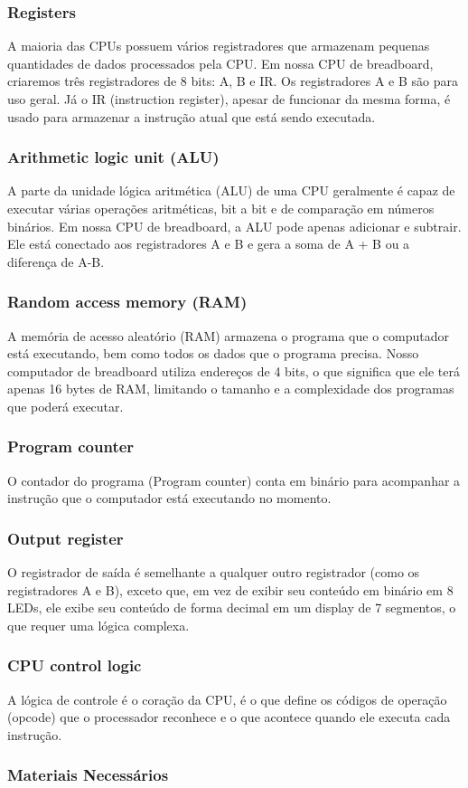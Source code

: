 \subsubsection{Registers}
A maioria das CPUs possuem vários registradores que armazenam pequenas quantidades de dados processados pela CPU. Em nossa CPU de breadboard, criaremos três registradores de 8 bits: A, B e IR. Os registradores A e B são para uso geral. Já o IR (instruction register), apesar de funcionar da mesma forma, é usado para armazenar a instrução atual que está sendo executada.

\subsubsection{Arithmetic logic unit (ALU)}
A parte da unidade lógica aritmética (ALU) de uma CPU geralmente é capaz de executar várias operações aritméticas, bit a bit e de comparação em números binários. Em nossa CPU de breadboard, a ALU pode apenas adicionar e subtrair. Ele está conectado aos registradores A e B e gera a soma de A + B ou a diferença de A-B.

\subsubsection{Random access memory (RAM)}
A memória de acesso aleatório (RAM) armazena o programa que o computador está executando, bem como todos os dados que o programa precisa. Nosso computador de breadboard utiliza endereços de 4 bits, o que significa que ele terá apenas 16 bytes de RAM, limitando o tamanho e a complexidade dos programas que poderá executar.

\subsubsection{Program counter}
O contador do programa (Program counter) conta em binário para acompanhar a instrução que o computador está executando no momento.

\subsubsection{Output register}
O registrador de saída é semelhante a qualquer outro registrador (como os registradores A e B), exceto que, em vez de exibir seu conteúdo em binário em 8 LEDs, ele exibe seu conteúdo de forma decimal em um display de 7 segmentos, o que requer uma lógica complexa.

\subsubsection{CPU control logic}
A lógica de controle é o coração da CPU, é o que define os códigos de operação (opcode) que o processador reconhece e o que acontece quando ele executa cada instrução.

\subsubsection{Materiais Necessários}

\newpage


